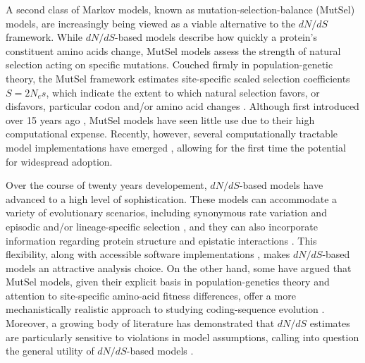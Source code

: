 \documentclass{pnastwo}
\begin{document}
\begin{article}
A second class of Markov models, known as mutation-selection-balance (MutSel) models, are increasingly being viewed as a viable alternative to the $dN/dS$ framework. While $dN/dS$-based models describe how quickly a protein's constituent amino acids change, MutSel models assess the strength of natural selection acting on specific mutations. Couched firmly in population-genetic theory, the MutSel framework estimates site-specific scaled selection coefficients $S=2N_es$, which indicate the extent to which natural selection favors, or disfavors, particular codon and/or amino acid changes \cite{HalpernBruno1998,YangNielsen2008,Rodrigueetal2010,Tamurietal2012}. Although first introduced over 15 years ago \cite{HalpernBruno1998}, MutSel models have seen little use due to their high computational expense. Recently, however, several computationally tractable model implementations have emerged \cite{RodrigueLartillot2014,Tamurietal2014}, allowing for the first time the potential for widespread adoption.		
		
Over the course of twenty years developement, $dN/dS$-based models have advanced to a high level of sophistication. These models can accommodate a variety of evolutionary scenarios, including synonymous rate variation \cite{MuseGaut1994,KosakovskyPondMuse2005} and episodic \cite{KosakovskyPondetal2011,MEME} and/or lineage-specific selection \cite{YangNielsen2002,Zhangetal2005,KosakovskyPondFrost2005a}, and they can also incorporate information regarding protein structure and epistatic interactions \cite{Robinsonetal2003,Thorneetal2007,Rodrigueetal2009,Scherreretal2012,MeyerWilke2013}. This flexibility, along with accessible software implementations \cite{KosakovskyPondetal2005,Yang2007,Delport2010}, makes $dN/dS$-based models an attractive analysis choice. On the other hand, some have argued that MutSel models, given their explicit basis in population-genetics theory and attention to site-specific amino-acid fitness differences, offer a more mechanistically realistic approach to studying coding-sequence evolution \cite{HalpernBruno1998,Rodrigueetal2010,Tamurietal2012,Thorne2012}. Moreover, a growing body of literature has demonstrated that $dN/dS$ estimates are particularly sensitive to violations in model assumptions, calling into question the general utility of $dN/dS$-based models \cite{Rochaetal2006,KryazhimskiyPlotkin2008,Mugaletal2014}.
		

\end{article}
\end{document}

